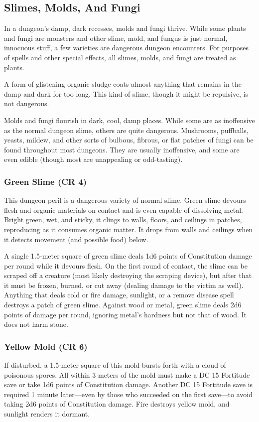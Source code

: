 \subsection{Slimes, Molds, And Fungi}
In a dungeon's damp, dark recesses, molds and fungi thrive. While some plants and fungi are monsters and other slime, mold, and fungus is just normal, innocuous stuff, a few varieties are dangerous dungeon encounters. For purposes of spells and other special effects, all slimes, molds, and fungi are treated as plants.

A form of glistening organic sludge coats almost anything that remains in the damp and dark for too long. This kind of slime, though it might be repulsive, is not dangerous.

Molds and fungi flourish in dark, cool, damp places. While some are as inoffensive as the normal dungeon slime, others are quite dangerous. Mushrooms, puffballs, yeasts, mildew, and other sorts of bulbous, fibrous, or flat patches of fungi can be found throughout most dungeons. They are usually inoffensive, and some are even edible (though most are unappealing or odd-tasting).

\subsubsection{Green Slime (CR 4)}
This dungeon peril is a dangerous variety of normal slime. Green slime devours flesh and organic materials on contact and is even capable of dissolving metal. Bright green, wet, and sticky, it clings to walls, floors, and ceilings in patches, reproducing as it consumes organic matter. It drops from walls and ceilings when it detects movement (and possible food) below.

A single 1.5-meter square of green slime deals 1d6 points of Constitution damage per round while it devours flesh. On the first round of contact, the slime can be scraped off a creature (most likely destroying the scraping device), but after that it must be frozen, burned, or cut away (dealing damage to the victim as well). Anything that deals cold or fire damage, sunlight, or a remove disease spell destroys a patch of green slime. Against wood or metal, green slime deals 2d6 points of damage per round, ignoring metal's hardness but not that of wood. It does not harm stone.

\subsubsection{Yellow Mold (CR 6)}
If disturbed, a 1.5-meter square of this mold bursts forth with a cloud of poisonous spores. All within 3 meters of the mold must make a DC 15 Fortitude save or take 1d6 points of Constitution damage. Another DC 15 Fortitude save is required 1 minute later---even by those who succeeded on the first save---to avoid taking 2d6 points of Constitution damage. Fire destroys yellow mold, and sunlight renders it dormant.

